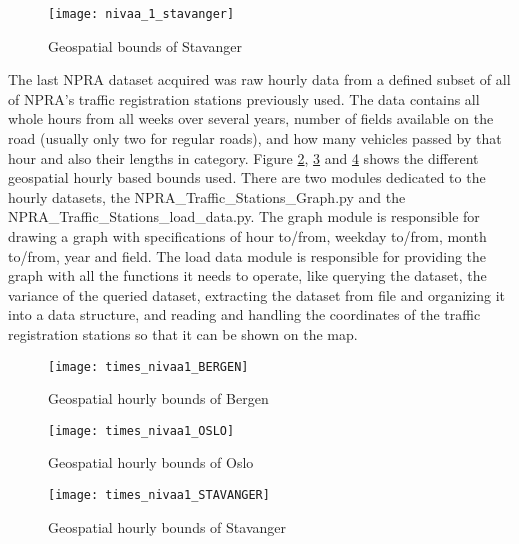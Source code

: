 \begin{figure}[ht]
\texttt{[image: nivaa\_1\_stavanger]}
\centering
\caption{Geospatial bounds of Stavanger}
\label{fig:boundsstavanger}
\end{figure}

The last NPRA dataset acquired was raw hourly data from a defined subset of all of NPRA's traffic registration stations previously used. The data contains all whole hours from all weeks over several years, number of fields available on the road (usually only two for regular roads), and how many vehicles passed by that hour and also their lengths in category. Figure \ref{fig:hboundsbergen}, \ref{fig:hboundsoslo} and \ref{fig:hboundsstavanger} shows the different geospatial hourly based bounds used. There are two modules dedicated to the hourly datasets, the NPRA\_Traffic\_Stations\_Graph.py and the NPRA\_Traffic\_Stations\_load\_data.py. The graph module is responsible for drawing a graph with specifications of hour to/from, weekday to/from, month to/from, year and field. The load data module is responsible for providing the graph with all the functions it needs to operate, like querying the dataset, the variance of the queried dataset, extracting the dataset from file and organizing it into a data structure, and reading and handling the coordinates of the traffic registration stations so that it can be shown on the map.

\begin{figure}[ht]
\texttt{[image: times\_nivaa1\_BERGEN]}
\centering
\caption{Geospatial hourly bounds of Bergen}
\label{fig:hboundsbergen}
\end{figure}

\begin{figure}[ht]
\texttt{[image: times\_nivaa1\_OSLO]}
\centering
\caption{Geospatial hourly bounds of Oslo}
\label{fig:hboundsoslo}
\end{figure}

\begin{figure}[ht]
\texttt{[image: times\_nivaa1\_STAVANGER]}
\centering
\caption{Geospatial hourly bounds of Stavanger}
\label{fig:hboundsstavanger}
\end{figure}

\newpage\newpage







